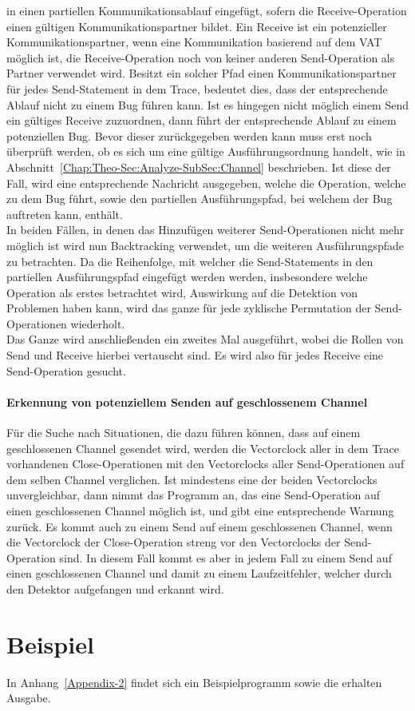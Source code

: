 in einen partiellen Kommunikationsablauf eingefügt, sofern die 
Receive-Operation einen gültigen Kommunikationspartner bildet. Ein Receive 
ist ein potenzieller Kommunikationspartner, wenn eine Kommunikation 
basierend auf dem VAT möglich ist, die Receive-Operation noch von keiner 
anderen Send-Operation als Partner verwendet wird. Besitzt ein solcher Pfad 
einen Kommunikationspartner für jedes Send-Statement in dem Trace, bedeutet dies, 
dass der entsprechende Ablauf nicht zu einem Bug führen kann. Ist es hingegen 
nicht möglich einem Send ein gültiges Receive zuzuordnen, dann führt der 
entsprechende Ablauf zu einem potenziellen Bug. Bevor dieser zurückgegeben 
werden kann muss erst noch überprüft werden, ob es sich um eine 
gültige Ausführungsordnung handelt, wie in Abschnitt~\ref{Chap:Theo-Sec:Analyze-SubSec:Channel} 
beschrieben. Ist diese der Fall, wird eine entsprechende Nachricht ausgegeben, 
welche die Operation, welche zu dem Bug führt, sowie den partiellen
Ausführungspfad, bei welchem der Bug auftreten kann, enthält.\\In beiden 
Fällen, in denen das Hinzufügen weiterer Send-Operationen nicht mehr möglich ist 
wird nun Backtracking verwendet, um die weiteren Ausführungspfade zu betrachten.
Da die Reihenfolge, mit welcher die Send-Statements in den partiellen 
Ausführungspfad eingefügt werden werden, insbesondere welche Operation als erstes 
betrachtet wird, Auswirkung auf die Detektion von Problemen haben kann, 
wird das ganze für jede zyklische Permutation der Send-Operationen wiederholt. \\
Das Ganze wird anschließenden ein zweites Mal ausgeführt, wobei die Rollen 
von Send und Receive hierbei vertauscht sind. Es wird also für jedes Receive 
eine Send-Operation gesucht. 

\paragraph{Erkennung von potenziellem Senden auf geschlossenem Channel}
Für die Suche nach Situationen, die dazu führen können, dass auf einem 
geschlossenen Channel gesendet wird, werden die Vectorclock aller in dem 
Trace vorhandenen Close-Operationen mit den Vectorclocks aller Send-Operationen
auf dem selben Channel verglichen. Ist mindestens eine der beiden Vectorclocks 
unvergleichbar, dann nimmt das Programm an, das eine Send-Operation auf 
einen geschlossenen Channel möglich ist, und gibt eine entsprechende 
Warnung zurück. Es kommt auch zu einem Send auf einem geschlossenen Channel, 
wenn die Vectorclock der Close-Operation streng vor den Vectorclocks 
der Send-Operation sind. In diesem Fall kommt es aber in jedem Fall zu einem 
Send auf einen geschlossenen Channel und damit zu einem Laufzeitfehler, 
welcher durch den Detektor aufgefangen und erkannt wird.


\section{Beispiel}
In Anhang~\ref{Appendix-2} findet sich ein Beispielprogramm sowie die erhalten Ausgabe. 